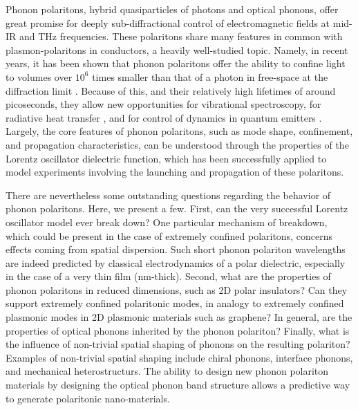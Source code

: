 \documentclass[superscriptaddress,reprint,prb]{revtex4-1}
\begin{document}
\maketitle

Phonon polaritons, hybrid quasiparticles of photons and optical phonons, offer great promise for deeply sub-diffractional control of electromagnetic fields at mid-IR and THz frequencies. These polaritons share many features in common with plasmon-polaritons in conductors, a heavily well-studied topic. Namely, in recent years, it has been shown that phonon polaritons offer the ability to confine light to volumes over $10^6$ times smaller than that of a photon in free-space at the diffraction limit \cite{caldwell2013low,xu2014mid,caldwell2014sub,dai2014tunable,tomadin2015accessing,yoxall2015direct,li2015hyperbolic,dai2015subdiffractional,dai2015graphene,caldwell2015low,li2016reversible,Basov:2016,basov2017towards,low2017polaritons,giles2017ultra}. Because of this, and their relatively high lifetimes of around picoseconds, they allow new opportunities for vibrational spectroscopy, for radiative heat transfer \cite{hillenbrand2002phonon}, and for control of dynamics in quantum emitters \cite{kumar2015tunable,rivera2017making}. Largely, the core features of phonon polaritons, such as mode shape, confinement, and propagation characteristics, can be understood through the properties of the Lorentz oscillator dielectric function, which has been successfully applied to model experiments involving the launching and propagation of these polaritons.

There are nevertheless some outstanding questions regarding the behavior of phonon polaritons. Here, we present a few. First, can the very successful Lorentz oscillator model ever break down? One particular mechanism of breakdown, which could be present in the case of extremely confined polaritons, concerns effects coming from spatial dispersion. Such short phonon polariton wavelengths are indeed predicted by classical electrodynamics of a polar dielectric, especially in the case of a very thin film (nm-thick). Second, what are the properties of phonon polaritons in reduced dimensions, such as 2D polar insulators? Can they support extremely confined polaritonic modes, in analogy to extremely confined plasmonic modes in 2D plasmonic materials such as graphene? In general, are the properties of optical phonons inherited by the phonon polariton? Finally, what is the influence of non-trivial spatial shaping of phonons on the resulting polariton? Examples of non-trivial spatial shaping include chiral phonons, interface phonons, and mechanical heterostructurs. The ability to design new phonon polariton materials by designing the optical phonon band structure allows a predictive way to generate polaritonic nano-materials.
\end{document}
